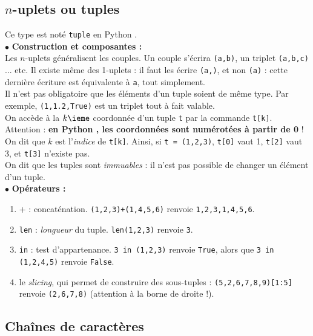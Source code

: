 \subsection{$n$-uplets ou tuples}

Ce type est noté \texttt{tuple} en Python .\\

\noindent$\bullet$ \textbf{Construction et composantes :}\\

Les $n$-uplets généralisent les couples. Un couple s'écrira \texttt{(a,b)}, un triplet 
\texttt{(a,b,c)} ... etc. Il existe même des 1-uplets : il faut les écrire \texttt{(a,)}, et non 
\texttt{(a)} : cette dernière écriture est équivalente à \texttt{a}, tout simplement.\\
Il n'est pas obligatoire que les éléments d'un tuple soient de même type. Par exemple, 
\texttt{(1,1.2,True)} est un triplet tout à fait valable.\\
On accède à la $k\ieme$ coordonnée d'un tuple \texttt{t} par la commande \texttt{t[k]}. Attention : 
\textbf{en Python , les coordonnées sont numérotées à partir de 0} ! On dit que $k$ est 
l'\emph{indice} de \texttt{t[k]}. Ainsi, si \texttt{t = (1,2,3)}, \texttt{t[0]} vaut 1, 
\texttt{t[2]} vaut 3, et \texttt{t[3]} n'existe pas.\\

On dit que les tuples sont \emph{immuables} : il n'est pas possible de changer un élément d'un 
tuple.\\

\noindent$\bullet$ \textbf{Opérateurs :}
\begin{enumerate}
 \item + : concaténation. \texttt{(1,2,3)+(1,4,5,6)} renvoie \texttt{1,2,3,1,4,5,6}.
 \item \texttt{len} : \emph{longueur} du tuple. \texttt{len(1,2,3)} renvoie \texttt{3}.
 \item \texttt{in} : test d'appartenance. \texttt{3 in (1,2,3)} renvoie \texttt{True}, alors que 
\texttt{3 in (1,2,4,5)} renvoie \texttt{False}.
\item le \emph{slicing}, qui permet de construire des sous-tuples : \texttt{(5,2,6,7,8,9)[1:5]} 
renvoie \texttt{(2,6,7,8)} (attention à la borne de droite !).\\
\end{enumerate}


\subsection{Chaînes de caractères}

